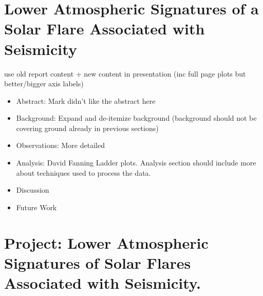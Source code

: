 \section{Lower Atmospheric Signatures of a Solar Flare Associated with Seismicity}
use old report content + new content in presentation (inc full page plots but better/bigger axis labels)
\begin{itemize}
\item Abstract: Mark didn't like the abstract here
\item Background: Expand and de-itemize background (background should not be covering ground already in previous sections)
\item Observations: More detailed
\item Analysis: David Fanning Ladder plots. Analysis section should include more about techniques used to process the data.
\item Discussion
\item Future Work
\end{itemize}



\section{Project: Lower Atmospheric Signatures of Solar Flares Associated with Seismicity.}\label{PRJ}

